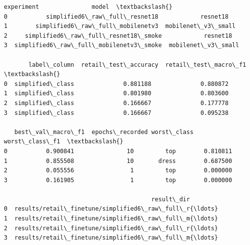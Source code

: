 \documentclass[11pt]{article}
\begin{document}
    
    \begin{Verbatim}[commandchars=\\\{\}]
                               experiment               model  \textbackslash{}
0           simplified6\_raw\_full\_resnet18            resnet18   
1        simplified6\_raw\_full\_mobilenetv3  mobilenet\_v3\_small   
2     simplified6\_raw\_full\_resnet18\_smoke            resnet18   
3  simplified6\_raw\_full\_mobilenetv3\_smoke  mobilenet\_v3\_small   

       label\_column  retail\_test\_accuracy  retail\_test\_macro\_f1  \textbackslash{}
0  simplified\_class              0.881188              0.880872   
1  simplified\_class              0.801980              0.803600   
2  simplified\_class              0.166667              0.177778   
3  simplified\_class              0.166667              0.095238   

   best\_val\_macro\_f1  epochs\_recorded worst\_class  worst\_class\_f1  \textbackslash{}
0           0.900841               10         top        0.810811   
1           0.855508               10       dress        0.687500   
2           0.055556                1         top        0.000000   
3           0.161905                1         top        0.000000   

                                          result\_dir  
0  results/retail\_finetune/simplified6\_raw\_full\_r{\ldots}  
1  results/retail\_finetune/simplified6\_raw\_full\_m{\ldots}  
2  results/retail\_finetune/simplified6\_raw\_full\_r{\ldots}  
3  results/retail\_finetune/simplified6\_raw\_full\_m{\ldots}  
    \end{Verbatim}
\end{document}
